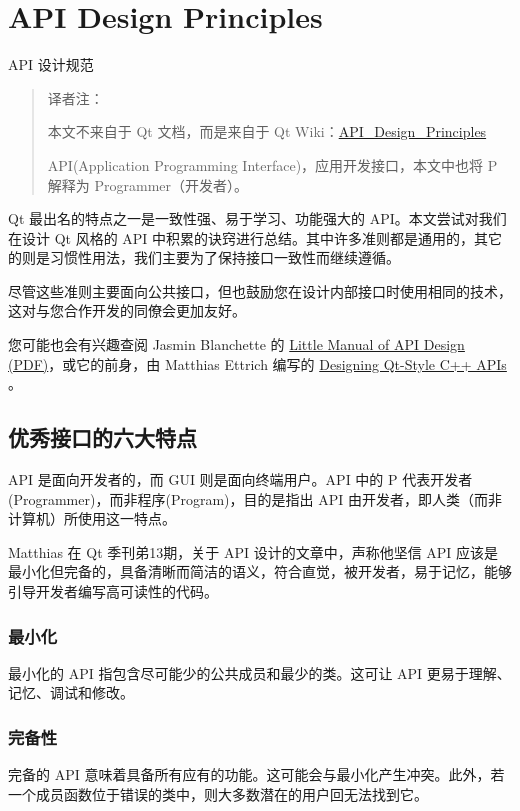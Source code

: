 \chapter{API Design Principles}


API 设计规范

\begin{quote}
译者注：

本文不来自于 Qt 文档，而是来自于 Qt Wiki：\href{https://wiki.qt.io/API_Design_Principles}{API\_Design\_Principles}

API(Application Programming Interface)，应用开发接口，本文中也将 P 解释为 Programmer（开发者）。	
\end{quote}

Qt 最出名的特点之一是一致性强、易于学习、功能强大的 API。本文尝试对我们在设计 Qt 风格的 API 中积累的诀窍进行总结。其中许多准则都是通用的，其它的则是习惯性用法，我们主要为了保持接口一致性而继续遵循。

尽管这些准则主要面向公共接口，但也鼓励您在设计内部接口时使用相同的技术，这对与您合作开发的同僚会更加友好。

您可能也会有兴趣查阅 Jasmin Blanchette 的 
\href{https://people.mpi-inf.mpg.de/~jblanche/api-design.pdf}{Little Manual of API Design (PDF)}，或它的前身，由 Matthias Ettrich 编写的 \href{https://doc.qt.io/archives/qq/qq13-apis.html}{Designing Qt-Style C++ APIs} 。

\section{优秀接口的六大特点}

API 是面向开发者的，而 GUI 则是面向终端用户。API 中的 P 代表开发者(Programmer)，而非程序(Program)，目的是指出 API 由开发者，即人类（而非计算机）所使用这一特点。

Matthias 在 Qt 季刊弟13期，关于 API 设计的文章中，声称他坚信 API 应该是最小化但完备的，具备清晰而简洁的语义，符合直觉，被开发者，易于记忆，能够引导开发者编写高可读性的代码。

\subsection{最小化}

最小化的 API 指包含尽可能少的公共成员和最少的类。这可让 API 更易于理解、记忆、调试和修改。

\subsection{完备性}
完备的 API 意味着具备所有应有的功能。这可能会与最小化产生冲突。此外，若一个成员函数位于错误的类中，则大多数潜在的用户回无法找到它。

